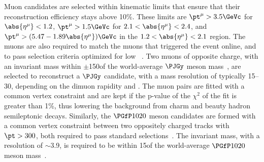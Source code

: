 Muon candidates are selected within kinematic limits
that ensure that their reconstruction efficiency stays above 10\%. These limits are $\pt^{\mu}>3.5\GeVc$ for $\abs{\eta^{\mu}}<1.2$, $\pt^{\mu}>1.5\GeVc$ for $2.1<\abs{\eta^{\mu}}<2.4$, and $\pt^{\mu} >  (5.47 - 1.89 \abs{\eta^{\mu}}) \GeVc$ in the $1.2<\abs{\eta^{\mu}}<2.1$ region. The muons are also required to match the muons that triggered the event online, and to pass selection criteria optimized for low \pt ~\cite{Chatrchyan:2012xi}. %
Two muons of opposite charge, with an invariant mass within $\pm$150\MeVcc of the world-average $\PJGy$ meson mass~\cite{pdg2018}, are selected to reconstruct a $\PJGy$ candidate, with a mass resolution of typically 15--30\MeVcc, depending on the dimuon rapidity and \pt. The muon pairs are fitted with a common vertex constraint and are kept if the p-value of the $\chi^2$ of the fit is greater than 1\%, thus lowering the background from charm and beauty hadron semileptonic decays. 
Similarly, the $\Pphi$ meson candidates are formed with a common vertex constraint between two oppositely charged tracks with $\pt>300$\MeVc, both required to pass standard selections~\cite{Khachatryan:2016odn}. The invariant mass, with a resolution of $\sim$3.9\MeVcc, is required to be within 15\MeVcc of the world-average $\Pphi$ meson mass~\cite{pdg2018}.

